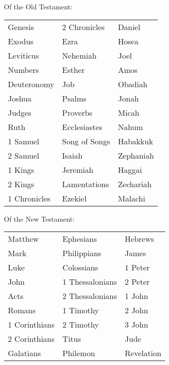 \begin{outerlst}[left=0pt,labelsep=0pt]
\begin{innerlst}[wide, labelwidth=!, labelindent=0pt, labelsep=4pt]
\begin{samepage}
\par Of the Old Testament:
\begin{center}
  \begin{tabular}{ p{4cm} p{4cm} p{4cm} }
    Genesis & 2 Chronicles & Daniel \\
    Exodus & Ezra & Hosea \\
    Leviticus & Nehemiah & Joel \\
    Numbers & Esther & Amos \\
    Deuteronomy & Job & Obadiah \\
    Joshua & Psalms & Jonah \\
    Judges & Proverbs & Micah \\
    Ruth & Ecclesiastes & Nahum \\
    1 Samuel & Song of Songs & Habakkuk \\
    2 Samuel & Isaiah & Zephaniah \\
    1 Kings & Jeremiah & Haggai \\
    2 Kings & Lamentations & Zechariah \\
    1 Chronicles & Ezekiel & Malachi \\
  \end{tabular}
\end{center}
\end{samepage}

\begin{samepage}
\par Of the New Testament: 
\begin{center}
  \begin{tabular}{ p{4cm} p{4cm} p{4cm} }
    Matthew & Ephesians & Hebrews \\
    Mark & Philippians & James \\
    Luke & Colossians & 1 Peter \\
    John & 1 Thessalonians & 2 Peter \\
    Acts & 2 Thessalonians & 1 John \\
    Romans & 1 Timothy & 2 John \\
    1 Corinthians & 2 Timothy & 3 John \\
    2 Corinthians & Titus & Jude \\
    Galatians & Philemon & Revelation \\
  \end{tabular}
\end{center}
\end{samepage}


\end{innerlst}
\end{outerlst}

